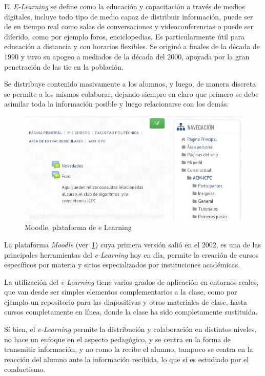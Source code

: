 El \emph{E-Learning} se define como la educación y capacitación a través de
medios digitales, incluye todo tipo de medio capaz de distribuir información,
puede ser de en tiempo real como salas de conversaciones y videoconferencias o
puede ser diferido, como por ejemplo foros, enciclopedias. Es particularmente
útil para educación a distancia y con horarios flexibles. Se originó a finales
de la década de $1990$ y tuvo su apogeo a mediados de la década del $2000$,
apoyada por la gran penetración de las \Gls{tic} en la
población\cite{punie:ict}.

Se distribuye contenido masivamente a los alumnos, y luego, de manera discreta
se permite a los mismos colaborar, dejando siempre en claro que primero se debe
asimilar toda la información posible y luego relacionarse con los
demás\cite{leinonen:ict}.


\begin{figure}[h] 
\centering 
\includegraphics[scale=0.5]{tics/images/moodle.jpg}
\caption{Moodle, plataforma de e Learning} 
\label{fig:moodle}
\end{figure}


La plataforma \emph{Moodle} (ver~\ref{fig:moodle}) cuya primera versión salió en
el $2002$, es una de las principales herramientas del \emph{e-Learning} hoy en
día, permite la creación de cursos específicos por materia y sitios
especializados por instituciones académicas\cite{perkins2006using}. 

La utilización del \emph{e-Learning} tiene varios grados de aplicación en
entornos reales\cite{punie:ict}, que van desde ser simples elementos
complementarios a la clase, como por ejemplo un repositorio para las
diapositivas y otros materiales de clase, hasta cursos completamente en línea,
donde la clase ha sido completamente sustituida.

Sí bien, el \emph{e-Learning} permite la distribución y colaboración en
distintos niveles, no hace un enfoque en el aspecto pedagógico, y se centra en
la forma de transmitir información, y no como la recibe el
alumno\cite{leinonen:ict}, tampoco se centra en la reacción del alumno ante la
información recibida, lo que sí es estudiado por el
conductismo\cite{weegar2012comparison}.

